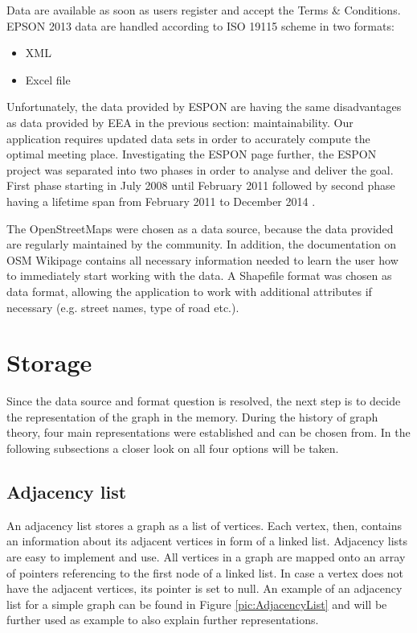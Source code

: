 \documentclass[thesis=M,english]{FITthesis}[2012/10/20]
\begin{document}
Data are available as soon as users register and accept the Terms \& Conditions. EPSON 2013 data are handled according to ISO 19115 scheme in two formats:

\begin{itemize}
\item XML
\item Excel file
\end{itemize}

Unfortunately, the data provided by ESPON are having the same disadvantages as data provided by EEA in the previous section: maintainability. Our application requires updated data sets in order to accurately compute the optimal meeting place. Investigating the ESPON page further, the ESPON project was separated into two phases in order to analyse and deliver the goal. First phase starting in July 2008 until February 2011 followed by second phase having a lifetime span from February 2011 to December 2014 \cite{ESPON13}. 


The OpenStreetMaps were chosen as a data source, because the data provided are regularly maintained by the community. In addition, the documentation on OSM Wikipage contains all necessary information needed to learn the user how to immediately start working with the data. A Shapefile format was chosen as data format, allowing the application to work with additional attributes if necessary (e.g. street names, type of road etc.).

\section{Storage}
\label{sec:storage}
Since the data source and format question is resolved, the next step is to decide the representation of the graph in the memory. During the history of graph theory, four main representations were established and can be chosen from. In the following subsections a closer look on all four options will be taken.

\subsection{Adjacency list}
An adjacency list stores a graph as a list of vertices. Each vertex, then, contains an information about its adjacent vertices in form of a linked list. 
Adjacency lists are easy to implement and use. 
All vertices in a graph are mapped onto an array of pointers referencing to the first node of a linked list. In case a vertex does not have the adjacent vertices, its pointer is set to null. 
An example of an adjacency list for a simple graph can be found in Figure \ref{pic:AdjacencyList} and will be further used as example to also explain further representations. 
\end{document}

